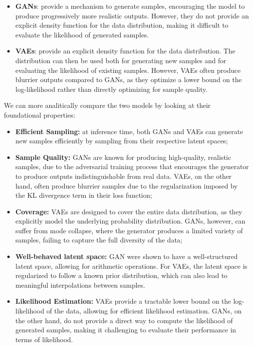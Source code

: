 \begin{itemize}
    \item \textbf{GANs}: provide a mechanism to generate samples, encouraging the model to produce progressively more realistic outputs. 
    However, they do not provide an explicit density function for the data distribution, making it difficult to evaluate the likelihood of generated samples.
    
    \item \textbf{VAEs}: provide an explicit density function for the data distribution. The distribution can then be used both for generating new samples and for evaluating the likelihood of existing samples. 
    However, VAEs often produce blurrier outputs compared to GANs, as they optimize a lower bound on the log-likelihood rather than directly optimizing for sample quality.
\end{itemize}

We can more analitically compare the two models by looking at their foundational properties:

\begin{itemize}
    \item \textbf{Efficient Sampling:} at inference time, both GANs and VAEs can generate new samples efficiently by sampling from their respective latent spaces;
    \item \textbf{Sample Quality:} GANs are known for producing high-quality, realistic samples, due to the adversarial training process that encourages the generator to produce outputs indistinguishable from real data. 
    VAEs, on the other hand, often produce blurrier samples due to the regularization imposed by the KL divergence term in their loss function;
    \item \textbf{Coverage:} VAEs are designed to cover the entire data distribution, as they explicitly model the underlying probability distribution.
    GANs, however, can suffer from mode collapse, where the generator produces a limited variety of samples, failing to capture the full diversity of the data;
    \item \textbf{Well-behaved latent space:} GAN were shown to have a well-structured latent space, allowing for arithmetic operations. 
    For VAEs, the latent space is regularized to follow a known prior distribution, which can also lead to meaningful interpolations between samples.
    \item \textbf{Likelihood Estimation:} VAEs provide a tractable lower bound on the log-likelihood of the data, allowing for efficient likelihood estimation.
    GANs, on the other hand, do not provide a direct way to compute the likelihood of generated samples, making it challenging to evaluate their performance in terms of likelihood.
\end{itemize}